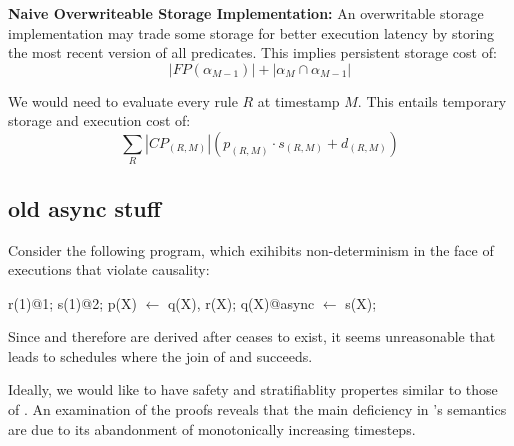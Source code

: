 {\bf Naive Overwriteable Storage Implementation: }An overwritable storage
implementation may trade some storage for better execution latency by storing
the most recent version of all predicates.  This implies persistent storage
cost of:
%
\[ |FP(\alpha_{M-1})| + |\alpha_M \cap \alpha_{M-1}| \]

We would need to evaluate every rule $R$ at timestamp $M$.  This entails
temporary storage and execution cost of:
%
\[ \sum_{R} |CP_{(R,M)}|(p_{(R,M)} \cdot s_{(R,M)} + d_{(R,M)}) \]





\subsection{old async stuff}

Consider
the following program, which exihibits non-determinism in the face of
executions that violate causality:

\begin{Dedalus}
r(1)@1;
s(1)@2;
p(X) \(\leftarrow\) q(X), r(X);
q(X)@async \(\leftarrow\) s(X);
\end{Dedalus}

Since  and therefore  are derived after
 ceases to exist, it seems unreasonable that
 leads to schedules where the join of 
and  succeeds.

Ideally, we would like \lang to have safety and stratifiablity
propertes similar to those of \slang.  An examination of the proofs
 reveals
that the main deficiency in \lang's semantics are due to its
abandonment of monotonically increasing timesteps.

